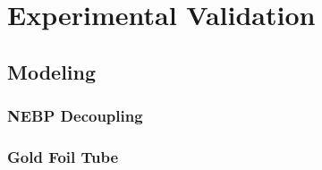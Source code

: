
\cleardoublepage


\chapter{Experimental Validation}




\section{Modeling}

\subsection{NEBP Decoupling}



\subsection{Gold Foil Tube}




